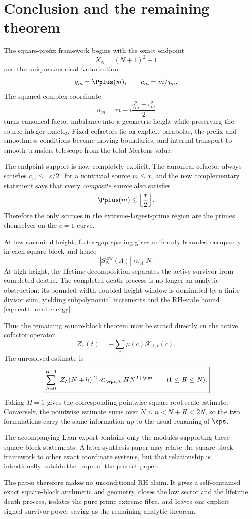 \section{Conclusion and the remaining theorem}
\label{sec:conclusion}

The square-prefix framework begins with the exact endpoint
\[
 X_N=(N+1)^2-1
\]
and the unique canonical factorization
\[
 q_m=\Pplus(m),\qquad c_m=m/q_m.
\]
The squared-complex coordinate
\[
 w_m=m+i\frac{q_m^2-c_m^2}{2}
\]
turns canonical factor imbalance into a geometric height while preserving the source integer exactly.  Fixed cofactors lie on explicit parabolas, the prefix and smoothness conditions become moving boundaries, and internal transport-to-smooth transfers telescope from the total Mertens value.

The endpoint support is now completely explicit.  The canonical cofactor always satisfies $c_m\le\lfloor x/2\rfloor$ for a nontrivial source $m\le x$, and the new complementary statement says that every \emph{composite} source also satisfies
\[
 \Pplus(m)\le\left\lfloor\frac{x}{2}\right\rfloor.
\]
Therefore the only sources in the extreme-largest-prime region are the primes themselves on the $c=1$ curve.

At low canonical height, factor-gap spacing gives uniformly bounded occupancy in each square block and hence
\[
 |S_N^{\mathrm{low}}(\Lambda)|\ll_\Lambda N.
\]
At high height, the lifetime decomposition separates the active survivor from completed deaths.  The completed death process is no longer an analytic obstruction: its bounded-width doubled-height window is dominated by a finite divisor sum, yielding subpolynomial increments and the RH-scale bound \cref{eq:death-local-energy}.

Thus the remaining square-block theorem may be stated directly on the active cofactor operator
\[
 Z_\Lambda(t)
 =-\sum_c\mu(c)\mathcal K_{\Lambda,t}(c).
\]
The unresolved estimate is
\begin{equation}
 \boxed{
 \sum_{h=0}^{H-1}|Z_\Lambda(N+h)|^2
 \ll_{\eps,\Lambda}H N^{2+\eps}
 \qquad(1\le H\le N).
 }
 \label{eq:conclusion-survivor}
\end{equation}
Taking $H=1$ gives the corresponding pointwise square-root-scale estimate.  Conversely, the pointwise estimate sums over $N\le n<N+H<2N$, so the two formulations carry the same information up to the usual renaming of $\eps$.

The accompanying Lean export contains only the modules supporting these square-block statements.  A later synthesis paper may relate the square-block framework to other exact coordinate systems, but that relationship is intentionally outside the scope of the present paper.

The paper therefore makes no unconditional RH claim.  It gives a self-contained exact square-block arithmetic and geometry, closes the low sector and the lifetime death process, isolates the pure-prime extreme fibre, and leaves one explicit signed survivor power saving as the remaining analytic theorem.

\appendix
